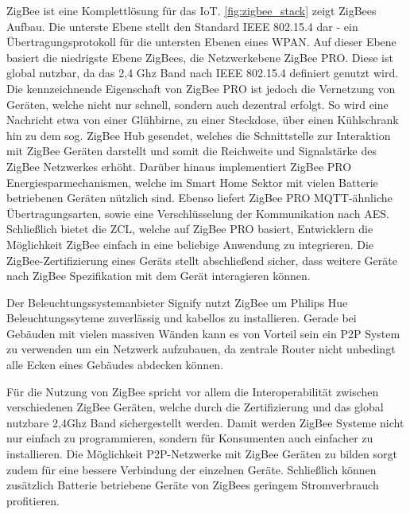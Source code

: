ZigBee ist eine Komplettlösung für das \ac{IoT}.
\autoref{fig:zigbee_stack} zeigt ZigBees Aufbau.
Die unterste Ebene stellt den Standard IEEE 802.15.4 dar - ein Übertragungsprotokoll für die untersten Ebenen eines \ac{WPAN}.
Auf dieser Ebene basiert die niedrigste Ebene ZigBees, die Netzwerkebene ZigBee PRO.
Diese ist global nutzbar, da das 2,4 Ghz Band nach IEEE 802.15.4 definiert genutzt wird.
Die kennzeichnende Eigenschaft von ZigBee PRO ist jedoch die Vernetzung von Geräten, welche nicht nur schnell, sondern auch dezentral erfolgt.
So wird eine Nachricht etwa von einer Glühbirne, zu einer Steckdose, über einen Kühlschrank hin zu dem sog. ZigBee Hub gesendet, welches die Schnittstelle zur Interaktion mit ZigBee Geräten darstellt und somit die Reichweite und Signalstärke des ZigBee Netzwerkes erhöht.
Darüber hinaus implementiert ZigBee PRO Energiesparmechanismen, welche im Smart Home Sektor mit vielen Batterie betriebenen Geräten nützlich sind.
Ebenso liefert ZigBee PRO \ac{MQTT}-ähnliche Übertragungsarten, sowie eine Verschlüsselung der Kommunikation nach \ac{AES}.
Schließlich bietet die \ac{ZCL}, welche auf ZigBee PRO basiert, Entwicklern die Möglichkeit ZigBee einfach in eine beliebige Anwendung zu integrieren.
Die ZigBee-Zertifizierung eines Geräts stellt abschließend sicher, dass weitere Geräte nach ZigBee Spezifikation mit dem Gerät interagieren können.

Der Beleuchtungssystemanbieter Signify nutzt ZigBee um Philips Hue Beleuchtungssyteme zuverlässig und kabellos zu installieren.
Gerade bei Gebäuden mit vielen massiven Wänden kann es von Vorteil sein ein \ac{P2P} System zu verwenden um ein Netzwerk aufzubauen, da zentrale Router nicht unbedingt alle Ecken eines Gebäudes abdecken können.

Für die Nutzung von ZigBee spricht vor allem die Interoperabilität zwischen verschiedenen ZigBee Geräten, welche durch die Zertifizierung und das global nutzbare 2,4Ghz Band sichergestellt werden.
Damit werden ZigBee Systeme nicht nur einfach zu programmieren, sondern für Konsumenten auch einfacher zu installieren.
Die Möglichkeit \ac{P2P}-Netzwerke mit ZigBee Geräten zu bilden sorgt zudem für eine bessere Verbindung der einzelnen Geräte.
Schließlich können zusätzlich Batterie betriebene Geräte von ZigBees geringem Stromverbrauch profitieren.

